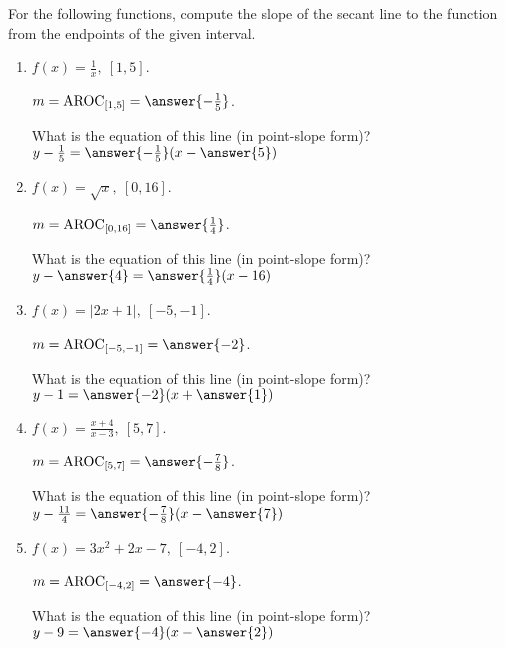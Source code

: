 \documentclass{ximera}
\author{Elizabeth Campolongo}
\begin{document}
\begin{exercise}

For the following functions, compute the slope of the secant line to the function from the endpoints of the given interval.

\begin{enumerate}
\item $f(x)= \frac{1}{x}, \ [1,5]$.

$m = \av_{[1, 5]} = \answer{-\frac{1}{5}}$.  
\begin{exercise}
What is the equation of this line (in point-slope form)?\\
$y-\frac{1}{5} = \answer{-\frac{1}{5}}(x-\answer{5})$
\end{exercise}

\item $f(x)= \sqrt{x}, \ [0,16]$.

$m = \av_{[0, 16]} = \answer{\frac{1}{4}}$.  
\begin{exercise}
What is the equation of this line (in point-slope form)?\\
$y-\answer{4} = \answer{\frac{1}{4}}(x-16)$
\end{exercise}

\item $f(x)= |2x+1|, \ [-5,-1]$.

$m = \av_{[-5,-1]} = \answer{-2}$.  
\begin{exercise}
What is the equation of this line (in point-slope form)?\\
$y - 1= \answer{-2}(x+\answer{1})$
\end{exercise}


\item $f(x)= \frac{x+4}{x-3}, \ [5,7]$.

$m = \av_{[5, 7]} = \answer{-\frac{7}{8}}$.  
\begin{exercise}
What is the equation of this line (in point-slope form)?\\
$y-\frac{11}{4} = \answer{-\frac{7}{8}}(x-\answer{7})$
\end{exercise}

\item $f(x)= 3x^2 +2x-7, \ [-4,2]$.

$m = \av_{[-4, 2]} = \answer{-4}$.  
\begin{exercise}
What is the equation of this line (in point-slope form)?\\
$y-9 = \answer{-4}(x -\answer{2})$
\end{exercise}
	
\end{enumerate}

\end{exercise}
\end{document}
